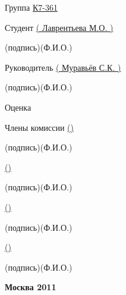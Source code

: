 \documentclass[12pt,a4paper,oneside]{article} %
\begin{document}
\begin{flushleft}
\large{Группа \underline{К7-361\hspace{13,75cm}}

Студент \underline{\hspace{9,1cm} (\hspace{0,5cm} Лаврентьева М.О. \hspace{0,5cm})}}

\hspace{6,5cm}\small{(подпись)}\hspace{5,2cm}\small{(Ф.И.О.)}

\large{Руководитель \underline{\hspace{7,92cm} (\hspace{0,84cm} Муравьёв С.К. \hspace{0,84cm})}}

\hspace{6,5cm}\small{(подпись)}\hspace{5,2cm}\small{(Ф.И.О.)}

\large{Оценка \underline{\hspace{15,2cm}}

Члены комиссии \underline{\hspace{7,3cm} ({\hspace{5,3cm}})}}

\hspace{6,5cm}\small{(подпись)}\hspace{5,2cm}\small{(Ф.И.О.)}

\large{\hspace{3,7cm} \underline{\hspace{7,3cm} ({\hspace{5,3cm}})}}

\hspace{6,5cm}\small{(подпись)}\hspace{5,2cm}\small{(Ф.И.О.)}

\large{\hspace{3,7cm} \underline{\hspace{7,3cm} ({\hspace{5,3cm}})}}

\hspace{6,5cm}\small{(подпись)}\hspace{5,2cm}\small{(Ф.И.О.)}

\large{\hspace{3,7cm} \underline{\hspace{7,3cm} ({\hspace{5,3cm}})}}

\hspace{6,5cm}\small{(подпись)}\hspace{5,2cm}\small{(Ф.И.О.)}

\end{flushleft}
\begin{center}
\vfill
\large{\textbf{Москва 2011}}
\end{center}
\newpage
\end{document}
